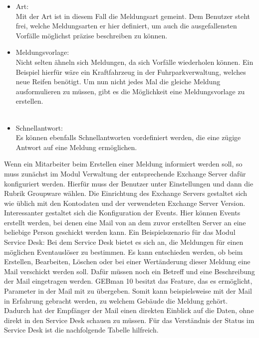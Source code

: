 \begin{itemize}[itemsep=10pt]
\item Art:\\
		Mit der Art ist in diesem Fall die Meldungsart gemeint. Dem Benutzer steht frei, welche 
		Meldungsarten er hier definiert, um auch die ausgefallensten Vorfälle möglichst präzise beschreiben zu 
		können.  \\
		 
\item Meldungsvorlage:\\
		Nicht selten ähneln sich Meldungen, da sich Vorfälle wiederholen können. Ein Beispiel hierfür wäre ein 
		Kraftfahrzeug in der Fuhrparkverwaltung, welches neue Reifen benötigt. Um nun nicht jedes Mal die 
		gleiche Meldung ausformulieren zu müssen, gibt es die Möglichkeit eine Meldungsvorlage zu erstellen. \\\\
		
\item Schnellantwort:\\
		Es können ebenfalls Schnellantworten vordefiniert werden, die eine zügige Antwort auf eine Meldung 
		ermöglichen.\\		
\end{itemize}

\noindent
Wenn ein Mitarbeiter beim Erstellen einer Meldung informiert werden soll, so muss zunächst im Modul Verwaltung der entsprechende Exchange Server dafür konfiguriert werden. Hierfür muss der Benutzer unter Einstellungen und dann die Rubrik Groupware wählen. Die Einrichtung des Exchange Servers gestaltet sich wie üblich mit den Kontodaten und der verwendeten Exchange Server Version.\newline
Interessanter gestaltet sich die Konfiguration der Events. Hier können Events erstellt werden, bei denen eine Mail von an dem zuvor erstellten Server an eine beliebige Person geschickt werden kann. Ein Beispielszenario für das Modul Service Desk:\newline
Bei dem Service Desk bietet es sich an, die Meldungen für einen möglichen Eventauslöser zu bestimmen. Es kann entschieden werden, ob beim Erstellen, Bearbeiten, Löschen oder bei einer Wertänderung dieser Meldung eine Mail verschickt werden soll. Dafür müssen noch ein Betreff und eine Beschreibung der Mail eingetragen werden. GEBman 10 besitzt das Feature, das es ermöglicht, Parameter in der Mail mit zu übergeben. Somit kann beispielsweise mit der Mail in Erfahrung gebracht werden, zu welchem Gebäude die Meldung gehört. Dadurch hat der Empfänger der Mail einen direkten Einblick auf die Daten, ohne direkt in den Service Desk schauen zu müssen.\newline
Für das Verständnis der Status im Service Desk ist die nachfolgende Tabelle hilfreich.\\

